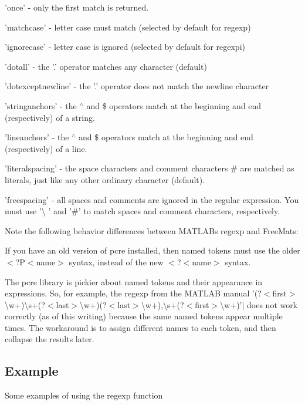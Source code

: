 \begin{DoxyItemize}
\item {\ttfamily 'once'} -\/ only the first match is returned.  
\item {\ttfamily 'matchcase'} -\/ letter case must match (selected by default for {\ttfamily regexp})  
\item {\ttfamily 'ignorecase'} -\/ letter case is ignored (selected by default for {\ttfamily regexpi})  
\item {\ttfamily 'dotall'} -\/ the {\ttfamily '.'} operator matches any character (default)  
\item {\ttfamily 'dotexceptnewline'} -\/ the {\ttfamily '.'} operator does not match the newline character  
\item {\ttfamily 'stringanchors'} -\/ the {\ttfamily $^\wedge$} and {\ttfamily \$} operators match at the beginning and end (respectively) of a string.  
\item {\ttfamily 'lineanchors'} -\/ the {\ttfamily $^\wedge$} and {\ttfamily \$} operators match at the beginning and end (respectively) of a line.  
\item {\ttfamily 'literalspacing'} -\/ the space characters and comment characters {\ttfamily \#} are matched as literals, just like any other ordinary character (default).  
\item {\ttfamily 'freespacing'} -\/ all spaces and comments are ignored in the regular expression. You must use '\textbackslash{} ' and '\#' to match spaces and comment characters, respectively.  
\end{DoxyItemize}Note the following behavior differences between M\-A\-T\-L\-A\-Bs regexp and Free\-Mats\-: 
\begin{DoxyItemize}
\item If you have an old version of {\ttfamily pcre} installed, then named tokens must use the older {\ttfamily $<$?P$<$name$>$} syntax, instead of the new {\ttfamily $<$?$<$name$>$} syntax.  
\item The {\ttfamily pcre} library is pickier about named tokens and their appearance in expressions. So, for example, the regexp from the M\-A\-T\-L\-A\-B manual {\ttfamily '(?$<$first$>$\textbackslash{}w+)\textbackslash{}s+(?$<$last$>$\textbackslash{}w+)}(?$<$last$>$\textbackslash{}w+),\textbackslash{}s+(?$<$first$>$\textbackslash{}w+)'$|$ does not work correctly (as of this writing) because the same named tokens appear multiple times. The workaround is to assign different names to each token, and then collapse the results later.  
\end{DoxyItemize}\hypertarget{variables_struct_Example}{}\subsection{Example}\label{variables_struct_Example}
Some examples of using the {\ttfamily regexp} function


